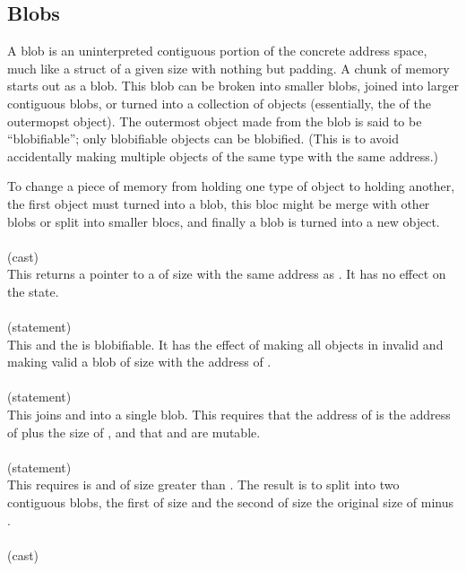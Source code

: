 \documentclass[preprint,nocopyrightspace]{sigplanconf}
\begin{document}
{{{{\subsection{Blobs}
A blob is an uninterpreted contiguous portion of the concrete address
space, much like a struct of a given size with nothing but padding. 
A chunk of memory starts out as a blob. This blob can be broken into
smaller blobs, joined into larger contiguous blobs, or turned into a
collection of objects (essentially, the  of the outermopst
object). The outermost object made from the blob is said to be
``blobifiable''; only blobifiable objects can be blobified. (This is
to avoid accidentally making multiple objects of the same type with
the same address.) 

To change a piece of memory from holding one type of object to holding
another, the first object must turned into a blob, this bloc might be 
merge with other blobs or split into smaller blocs, and finally a blob
is turned into a new object. 
\\\\
 (cast)\\
This returns a pointer to a  of size  with the same
address as . It has no effect on the state. 
\\\\
 (statement)\\
This    and
the \vcc{\object} is blobifiable. It has the effect of making all
objects in  invalid and making valid a blob of
size  with the address of .
\\\\ 
 (statement)\\
This joins  and  into a single blob. This requires that
the address of  is the address of  plus the size
of , and that  and  are mutable.
\\\\
 (statement)\\
This requires  is \vcc{\mutable} and of size greater
than . The result is to split  into two contiguous
blobs, the first of size  and the second of size the original
size of  minus .
\\\\
 (cast) \\
}}}}
\end{document}
